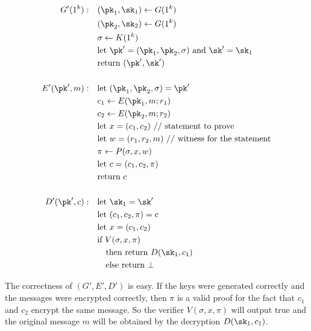 \begin{align*}
G'(1^k):\quad & (\pk_1,\sk_1) \leftarrow G(1^k) \\
              & (\pk_2,\sk_2) \leftarrow G(1^k) \\
              & \sigma \leftarrow K(1^k) \\
              & \text{let $\pk'=(\pk_1,\pk_2,\sigma)$ and $\sk'=\sk_1$} \\
              & \text{return $(\pk',\sk')$} \\
& \\
E'(\pk',m):\quad & \text{let $(\pk_1,\pk_2,\sigma)=\pk'$} \\
                 & c_1 \leftarrow E(\pk_1,m;r_1) \\
                 & c_2 \leftarrow E(\pk_2,m;r_2) \\
                 & \text{let $x=(c_1,c_2)$ // statement to prove} \\
                 & \text{let $w=(r_1,r_2,m)$ // witness for the statement} \\
                 & \pi \leftarrow P(\sigma,x,w) \\
                 & \text{let $c=(c_1,c_2,\pi)$} \\
                 & \text{return $c$} \\
& \\
D'(\pk',c):\quad & \text{let $\sk_1=\sk'$} \\
                 & \text{let $(c_1,c_2,\pi)=c$} \\
                 & \text{let $x=(c_1,c_2)$} \\
                 & \text{if $V(\sigma,x,\pi)$} \\
                 & \quad\text{then return $D(\sk_1,c_1)$} \\
                 & \quad\text{else return $\bot$} \\
\end{align*}

The correctness of $(G',E',D')$ is easy. If the keys were generated correctly and the
messages were encrypted correctly, then $\pi$ is a valid proof for the fact that
$c_1$ and $c_2$ encrypt the same message. So the verifier $V(\sigma,x,\pi)$ will
output true and the original message $m$ will be obtained by the decryption $D(\sk_1,c_1)$.

